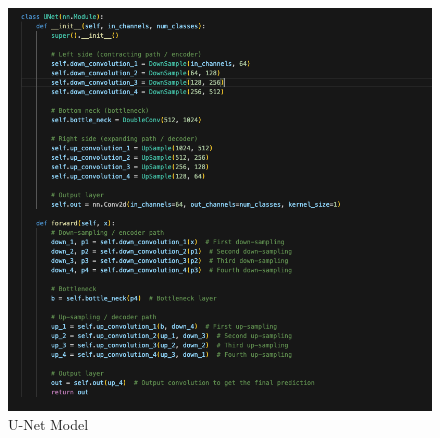 \documentclass[11pt,a4paper]{article}
\begin{document}
\begin{figure}[H]
    \centering
    \includegraphics[width= 0.9\linewidth]{model_imple.png}
    \caption{U-Net Model}
    
\end{figure}
\vspace{0.6cm}
\end{document}
